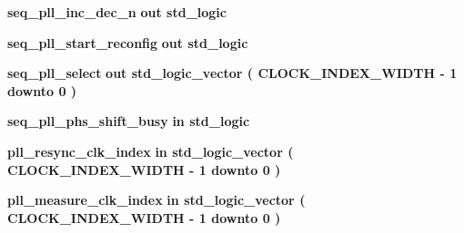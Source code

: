 \begin{DoxyCompactItemize}
\item 
{\bf seq\+\_\+pll\+\_\+inc\+\_\+dec\+\_\+n}  {\bfseries {\bfseries \textcolor{keywordflow}{out}\textcolor{vhdlchar}{ }}} {\bfseries \textcolor{comment}{std\+\_\+logic}\textcolor{vhdlchar}{ }} 
\item 
{\bf seq\+\_\+pll\+\_\+start\+\_\+reconfig}  {\bfseries {\bfseries \textcolor{keywordflow}{out}\textcolor{vhdlchar}{ }}} {\bfseries \textcolor{comment}{std\+\_\+logic}\textcolor{vhdlchar}{ }} 
\item 
{\bf seq\+\_\+pll\+\_\+select}  {\bfseries {\bfseries \textcolor{keywordflow}{out}\textcolor{vhdlchar}{ }}} {\bfseries \textcolor{comment}{std\+\_\+logic\+\_\+vector}\textcolor{vhdlchar}{ }\textcolor{vhdlchar}{(}\textcolor{vhdlchar}{ }\textcolor{vhdlchar}{ }\textcolor{vhdlchar}{ }\textcolor{vhdlchar}{ }{\bfseries {\bf C\+L\+O\+C\+K\+\_\+\+I\+N\+D\+E\+X\+\_\+\+W\+I\+D\+TH}} \textcolor{vhdlchar}{-\/}\textcolor{vhdlchar}{ } \textcolor{vhdldigit}{1} \textcolor{vhdlchar}{ }\textcolor{keywordflow}{downto}\textcolor{vhdlchar}{ }\textcolor{vhdlchar}{ } \textcolor{vhdldigit}{0} \textcolor{vhdlchar}{ }\textcolor{vhdlchar}{)}\textcolor{vhdlchar}{ }} 
\item 
{\bf seq\+\_\+pll\+\_\+phs\+\_\+shift\+\_\+busy}  {\bfseries {\bfseries \textcolor{keywordflow}{in}\textcolor{vhdlchar}{ }}} {\bfseries \textcolor{comment}{std\+\_\+logic}\textcolor{vhdlchar}{ }} 
\item 
{\bf pll\+\_\+resync\+\_\+clk\+\_\+index}  {\bfseries {\bfseries \textcolor{keywordflow}{in}\textcolor{vhdlchar}{ }}} {\bfseries \textcolor{comment}{std\+\_\+logic\+\_\+vector}\textcolor{vhdlchar}{ }\textcolor{vhdlchar}{(}\textcolor{vhdlchar}{ }\textcolor{vhdlchar}{ }\textcolor{vhdlchar}{ }\textcolor{vhdlchar}{ }{\bfseries {\bf C\+L\+O\+C\+K\+\_\+\+I\+N\+D\+E\+X\+\_\+\+W\+I\+D\+TH}} \textcolor{vhdlchar}{-\/}\textcolor{vhdlchar}{ } \textcolor{vhdldigit}{1} \textcolor{vhdlchar}{ }\textcolor{keywordflow}{downto}\textcolor{vhdlchar}{ }\textcolor{vhdlchar}{ } \textcolor{vhdldigit}{0} \textcolor{vhdlchar}{ }\textcolor{vhdlchar}{)}\textcolor{vhdlchar}{ }} 
\item 
{\bf pll\+\_\+measure\+\_\+clk\+\_\+index}  {\bfseries {\bfseries \textcolor{keywordflow}{in}\textcolor{vhdlchar}{ }}} {\bfseries \textcolor{comment}{std\+\_\+logic\+\_\+vector}\textcolor{vhdlchar}{ }\textcolor{vhdlchar}{(}\textcolor{vhdlchar}{ }\textcolor{vhdlchar}{ }\textcolor{vhdlchar}{ }\textcolor{vhdlchar}{ }{\bfseries {\bf C\+L\+O\+C\+K\+\_\+\+I\+N\+D\+E\+X\+\_\+\+W\+I\+D\+TH}} \textcolor{vhdlchar}{-\/}\textcolor{vhdlchar}{ } \textcolor{vhdldigit}{1} \textcolor{vhdlchar}{ }\textcolor{keywordflow}{downto}\textcolor{vhdlchar}{ }\textcolor{vhdlchar}{ } \textcolor{vhdldigit}{0} \textcolor{vhdlchar}{ }\textcolor{vhdlchar}{)}\textcolor{vhdlchar}{ }} 

\end{DoxyCompactItemize}
